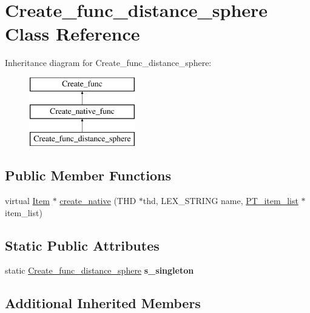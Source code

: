 \hypertarget{classCreate__func__distance__sphere}{}\section{Create\+\_\+func\+\_\+distance\+\_\+sphere Class Reference}
\label{classCreate__func__distance__sphere}
Inheritance diagram for Create\+\_\+func\+\_\+distance\+\_\+sphere\+:\begin{figure}[H]
\begin{center}
\leavevmode
\includegraphics[height=3.000000cm]{classCreate__func__distance__sphere}
\end{center}
\end{figure}
\subsection*{Public Member Functions}
\begin{DoxyCompactItemize}
\item 
virtual \mbox{\hyperlink{classItem}{Item}} $\ast$ \mbox{\hyperlink{classCreate__func__distance__sphere_a8225c0c2a7b8b2234fb42ed6f19c9182}{create\+\_\+native}} (T\+HD $\ast$thd, L\+E\+X\+\_\+\+S\+T\+R\+I\+NG name, \mbox{\hyperlink{classPT__item__list}{P\+T\+\_\+item\+\_\+list}} $\ast$item\+\_\+list)
\end{DoxyCompactItemize}
\subsection*{Static Public Attributes}
\begin{DoxyCompactItemize}
\item 
\mbox{\label{classCreate__func__distance__sphere_a696b0cdd6a440c657ad2c5bf614f4796}} 
static \mbox{\hyperlink{classCreate__func__distance__sphere}{Create\+\_\+func\+\_\+distance\+\_\+sphere}} {\bfseries s\+\_\+singleton}
\end{DoxyCompactItemize}
\subsection*{Additional Inherited Members}


